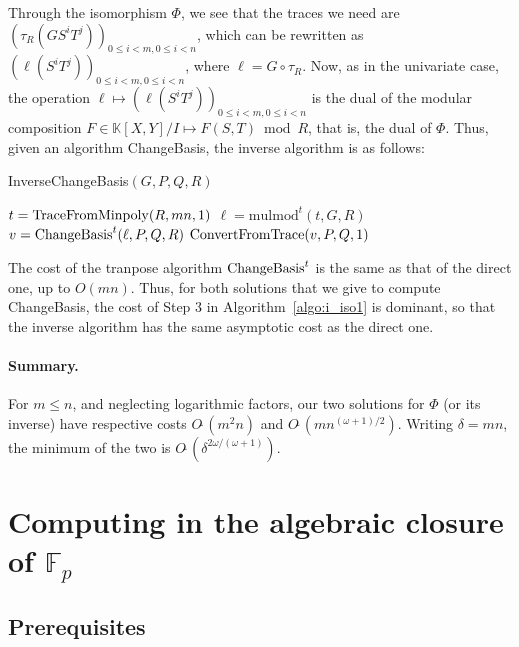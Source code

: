 \documentclass[12pt]{article}
\def\F {\ensuremath{\mathbb{F}}}
\def\K {\ensuremath{\mathbb{K}}}
\def\mulmod {\ensuremath{\mathrm{mulmod}}}
\begin{document}
Through the isomorphism $\Phi$, we see that the traces we need are
$(\tau_R(G S^i T^j))_{0 \le i < m, 0 \le i < n}$, which can be
rewritten as $(\ell(S^i T^j))_{0 \le i < m, 0 \le i < n}$, where $\ell
= G \circ \tau_R$. Now, as in the univariate case, the operation $\ell
\mapsto (\ell(S^i T^j))_{0 \le i < m, 0 \le i < n}$ is the dual of the
modular composition $F \in \K[X,Y]/I \mapsto F(S,T) \bmod R$, that is,
the dual of $\Phi$. Thus, given an algorithm ChangeBasis, the inverse
algorithm is as follows:


\begin{algorithm}[H]
  \caption{InverseChangeBasis$(G,P,Q,R)$}
  \begin{algorithmic}[1]
   \STATE $t = {\rm TraceFromMinpoly}(R, mn, 1)$
   \STATE $\ell =\mulmod^t(t, G, R)$
   \STATE $v = {\rm ChangeBasis}^t(\ell, P, Q, R)$
   \RETURN ${\rm ConvertFromTrace}(v, P, Q, 1)$
  \end{algorithmic}
  \label{algo:i_iso1}
\end{algorithm}

The cost of the tranpose algorithm ${\rm ChangeBasis}^t$ is the same
as that of the direct one, up to $O(mn)$. Thus, for both solutions
that we give to compute ChangeBasis, the cost of Step 3 in
Algorithm~\ref{algo:i_iso1} is dominant, so that the inverse algorithm
has the same asymptotic cost as the direct one.

\paragraph{Summary.} For $m \le n$, and neglecting logarithmic factors,
our two solutions for $\Phi$ (or its inverse) have respective costs
$O\tilde{~}(m^2 n)$ and $O\tilde{~}(m n^{(\omega+1)/2})$. Writing
$\delta=mn$, the minimum of the two is
$O\tilde{~}(\delta^{2\omega/(\omega+1)})$.


\section{Computing in the algebraic closure of $\F_p$}


\subsection{Prerequisites}
\end{document}
